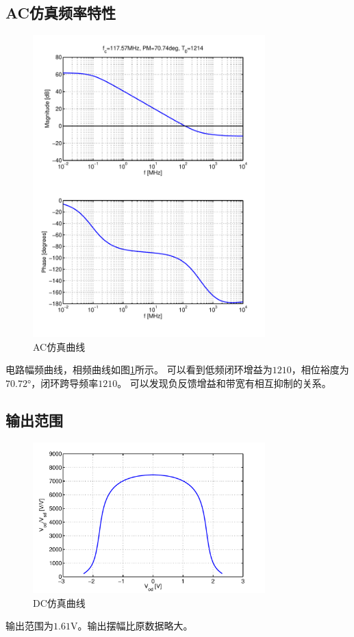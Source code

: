 \documentclass[a4paper]{article}
\newcommand{\uV}{\si{\volt}}
\newcommand{\udeg}{\si{\degree}}
\begin{document}
\subsection{AC仿真频率特性}
\begin{figure}[htb]
    \begin{center}
        \includegraphics[width=0.8\textwidth]{fast/ac.pdf}
    \end{center}
    \caption{AC仿真曲线}
    \label{fastac}
\end{figure}
电路幅频曲线，相频曲线如图\ref{fastac}所示。
可以看到低频闭环增益为$1210$，相位裕度为$70.72\udeg$，闭环跨导频率$1210$。
可以发现负反馈增益和带宽有相互抑制的关系。
\newpage
\clearpage
\subsection{输出范围}
\begin{figure}[htb]
    \begin{center}
        \includegraphics[width=0.8\textwidth]{fast/dc.pdf}
    \end{center}
    \caption{DC仿真曲线}
    \label{fastdc}
\end{figure}
输出范围为$1.61\uV$。输出摆幅比原数据略大。
\newpage
\clearpage
\end{document}
